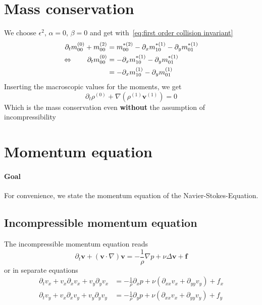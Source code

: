 \documentclass{article}
\begin{document}
\section{Mass conservation}
\label{sec:Mass conservation}
We choose $\epsilon^2$, $\alpha=0$, $\beta=0$ and get with~\eqref{eq:first order collision invariant}
\begin{equation}
    \begin{aligned}
      \partial_t m_{00}^{(0)} + m_{00}^{(2)} & =  m_{00}^{*(2)} - \partial_x m_{10}^{*(1)} - \partial_y m_{01}^{*(1)} \\
      \Leftrightarrow \qquad \partial_t m_{00}^{(0)} & =  - \partial_x m_{10}^{*(1)} - \partial_y m_{01}^{*(1)} \\
      & =  - \partial_x m_{10}^{(1)} - \partial_y m_{01}^{(1)}
    \end{aligned}
\end{equation}
Inserting the macroscopic values for the moments, we get
\begin{equation}
  \partial_t \rho^{(0)} + \nabla (\rho^{(1)} \mathbf{v}^{(1)}) = 0
\end{equation}
Which is the mass conservation even \textbf{without} the assumption of incompressibility

\section{Momentum equation}
\label{sec:Momentum equation}
\paragraph{Goal}
\label{par:Goal}
For convenience, we state the momentum equation of the Navier-Stokes-Equation.

\subsection{Incompressible momentum equation}
\label{sub:Incompressible momentum equation}
The incompressible momentum equation reads
\begin{equation}
  \partial_t \mathbf{v} + \left(\mathbf{v}\cdot\nabla\right)\mathbf{v} = - \frac{1}{\rho}\nabla p + \nu \Delta \mathbf{v} + \mathbf{f}
\end{equation}
or in separate equations
\begin{equation}
  \begin{aligned}
    \partial_t v_x + v_x \partial_x v_x + v_y \partial_y v_x
    &= -  \frac{1}{\rho}\partial_x p + \nu (\partial_{xx} v_x + \partial_{yy} v_y) + f_x \\
    \partial_t v_y + v_x \partial_x v_y + v_y \partial_y v_y
    &= -  \frac{1}{\rho}\partial_y p + \nu (\partial_{xx} v_x + \partial_{yy} v_y) + f_y
  \end{aligned}
\end{equation}
\end{document}
